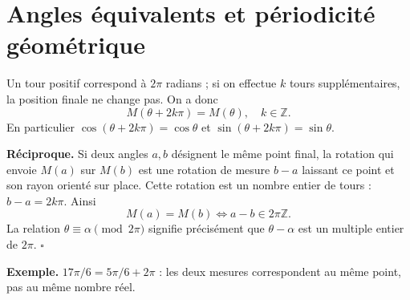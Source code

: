 \documentclass[../cours_spe_trigo.tex]{subfiles}
\begin{document}
\section{Angles équivalents et périodicité géométrique}
Un tour positif correspond à $2\pi$ radians ; si on effectue $k$ tours supplémentaires, la position finale ne change pas. On a donc
\[\boxed{M(\theta+2k\pi)=M(\theta),\quad k\in\mathbb Z.}\]
En particulier $\cos(\theta+2k\pi)=\cos\theta$ et $\sin(\theta+2k\pi)=\sin\theta$.
\begin{demonstration}
\textbf{Réciproque.} Si deux angles $a,b$ désignent le même point final, la rotation qui envoie $M(a)$ sur $M(b)$ est une rotation de mesure $b-a$ laissant ce point et son rayon orienté sur place. Cette rotation est un nombre entier de tours : $b-a=2k\pi$. Ainsi
\[\boxed{M(a)=M(b)\iff a-b\in2\pi\mathbb Z.}\]
La relation $\theta\equiv\alpha\pmod{2\pi}$ signifie précisément que $\theta-\alpha$ est un multiple entier de $2\pi$. $\square$
\end{demonstration}
\textbf{Exemple.} $17\pi/6=5\pi/6+2\pi$ : les deux mesures correspondent au même point, pas au même nombre réel.
\end{document}
